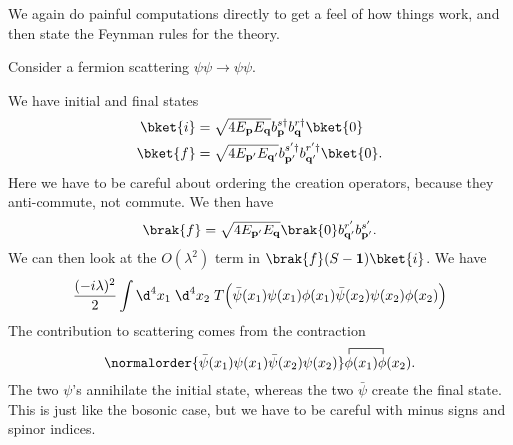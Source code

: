 \documentclass[a4paper]{article}
\begin{document}
We again do painful computations directly to get a feel of how things work, and then state the Feynman rules for the theory.
\begin{eg}
  Consider a fermion scattering $\psi\psi \to \psi\psi$.
  \begin{center}
  \end{center}
  We have initial and final states
  \begin{align*}
    \bket{i} &= \sqrt{4 E_\mathbf{p} E_\mathbf{q}} b_\mathbf{p}^{s\dagger}b_\mathbf{q}^{r\dagger} \bket{0}\\
    \bket{f} &= \sqrt{4 E_{\mathbf{p}'} E_{\mathbf{q}'}} b_{\mathbf{p}'}^{s'\dagger}b_{\mathbf{q}'}^{r'\dagger} \bket{0}.
  \end{align*}
  Here we have to be careful about ordering the creation operators, because they anti-commute, not commute. We then have
  \[
    \brak{f} = \sqrt{4 E_{\mathbf{p}'} E_{\mathbf{q}}} \brak{0} b_{\mathbf{q}'}^{r'} b_{\mathbf{p}'}^{s'}.
  \]
  We can then look at the $O(\lambda^2)$ term in $\brak{f}(S - \mathbf{1})\bket{i}$. We have
  \[
    \frac{(-i\lambda)^2}{2} \int \d^4 x_1 \;\d^4 x_2\; T\Big(\bar\psi(x_1) \psi(x_1) \phi(x_1) \bar\psi(x_2) \psi(x_2) \phi(x_2)\Big)
  \]
  The contribution to scattering comes from the contraction
  \[
    \normalorder{\bar\psi(x_1) \psi(x_1) \bar\psi(x_2) \psi(x_2)} \contraction{}{\phi}{(x_1)}{\phi}\phi(x_1) \phi(x_2).
  \]
  The two $\psi$'s annihilate the initial state, whereas the two $\bar\psi$ create the final state. This is just like the bosonic case, but we have to be careful with minus signs and spinor indices.


\end{eg}
\end{document}
